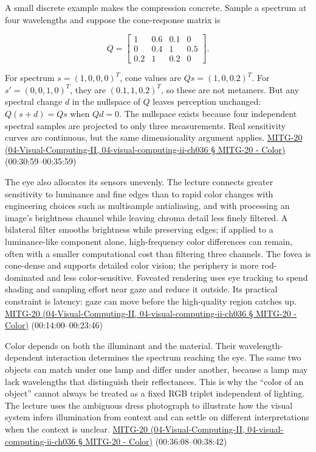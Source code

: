 A small discrete example makes the compression concrete. Sample a spectrum at four wavelengths and suppose the cone-response matrix is

\[
Q=\begin{bmatrix}1&0.6&0.1&0\\0&0.4&1&0.5\\0.2&1&0.2&0\end{bmatrix}.
\]

For spectrum \(s=(1,0,0,0)^T\), cone values are \(Qs=(1,0,0.2)^T\). For \(s'=(0,0,1,0)^T\), they are \((0.1,1,0.2)^T\), so these are not metamers. But any spectral change \(d\) in the nullspace of \(Q\) leaves perception unchanged: \(Q(s+d)=Qs\) when \(Qd=0\). The nullspace exists because four independent spectral samples are projected to only three measurements. Real sensitivity curves are continuous, but the same dimensionality argument applies. \href{}{MITG-20 (04-Visual-Computing-II, 04-visual-computing-ii-ch036 § MITG-20 - Color)} (00:30:59--00:35:59)

The eye also allocates its sensors unevenly. The lecture connects greater sensitivity to luminance and fine edges than to rapid color changes with engineering choices such as multisample antialiasing, and with processing an image's brightness channel while leaving chroma detail less finely filtered. A bilateral filter smooths brightness while preserving edges; if applied to a luminance-like component alone, high-frequency color differences can remain, often with a smaller computational cost than filtering three channels. The fovea is cone-dense and supports detailed color vision; the periphery is more rod-dominated and less color-sensitive. Foveated rendering uses eye tracking to spend shading and sampling effort near gaze and reduce it outside. Its practical constraint is latency: gaze can move before the high-quality region catches up. \href{}{MITG-20 (04-Visual-Computing-II, 04-visual-computing-ii-ch036 § MITG-20 - Color)} (00:14:00--00:23:46)

Color depends on both the illuminant and the material. Their wavelength-dependent interaction determines the spectrum reaching the eye. The same two objects can match under one lamp and differ under another, because a lamp may lack wavelengths that distinguish their reflectances. This is why the ``color of an object'' cannot always be treated as a fixed RGB triplet independent of lighting. The lecture uses the ambiguous dress photograph to illustrate how the visual system infers illumination from context and can settle on different interpretations when the context is unclear. \href{}{MITG-20 (04-Visual-Computing-II, 04-visual-computing-ii-ch036 § MITG-20 - Color)} (00:36:08--00:38:42)

